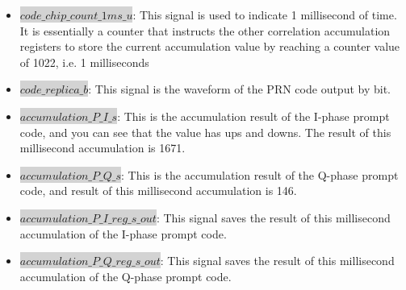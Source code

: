 \begin{itemize}
    \item \colorbox{lightgray}{$code\_chip\_count\_1ms\_u$}: This signal is used to indicate 1 millisecond of time. It is essentially a counter that instructs the other correlation accumulation registers to store the current accumulation value by reaching a counter value of 1022, i.e. 1 milliseconds
    \item \colorbox{lightgray}{$code\_replica\_b$}:  This signal is the waveform of the PRN  code output by bit.
    \item \colorbox{lightgray}{$accumulation\_P\_I\_s$}: This is the accumulation result of the I-phase prompt code, and you can see that the value has ups and downs. The result of this millisecond accumulation is \num{1671}.
    \item \colorbox{lightgray}{$accumulation\_P\_Q\_s$}: This is the accumulation result of the Q-phase prompt code, and result of this millisecond accumulation is \num{146}.
    \item \colorbox{lightgray}{$accumulation\_P\_I\_reg\_s\_out$}: This signal saves the result of this millisecond accumulation of the I-phase prompt code.
    \item \colorbox{lightgray}{$accumulation\_P\_Q\_reg\_s\_out$}: This signal saves the result of this millisecond accumulation of the Q-phase prompt code.
\end{itemize}

